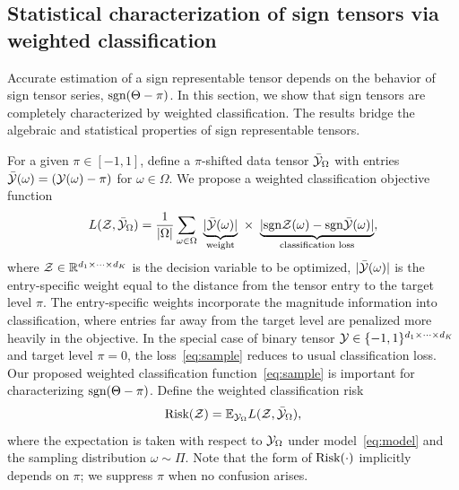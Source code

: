 \documentclass[useAMS,usenatbib,usegraphicx,referee]{biom}
\theoremstyle{plain}
\theoremstyle{definition}
\newcommand*{\KeepStyleUnderBrace}[1]{%
  \mathop{%
    \mathchoice
    {\underbrace{\displaystyle#1}}%
    {\underbrace{\textstyle#1}}%
    {\underbrace{\scriptstyle#1}}%
    {\underbrace{\scriptscriptstyle#1}}%
  }\limits
}
\def\sign{\textup{sgn}}
\begin{document}
\vspace{-.6cm}
\subsection{Statistical characterization of sign tensors via weighted classification}\label{sec:identifiability}

Accurate estimation of a sign representable tensor depends on the behavior of sign tensor series, $\sign(\Theta-\pi)$. In this section, we show that sign tensors are completely characterized by weighted classification. The results bridge the algebraic and statistical properties of sign representable tensors.
 
For a given $\pi \in [-1,1]$, define a $\pi$-shifted data tensor $\bar {\mathcal{Y}}_\Omega$ with entries $\bar {\mathcal{Y}}(\omega) = (\mathcal{Y}(\omega)-\pi)$ for $\omega\in \Omega$. We propose a weighted classification objective function
\begin{equation}\label{eq:sample}
L(\tZ, \bar \tY_\Omega)= {1\over |\Omega|}\sum_{\omega \in \Omega}\ \KeepStyleUnderBrace{|\bar \tY(\omega)|}_{\text{weight}}\  \times \ \KeepStyleUnderBrace{| \sign \tZ(\omega)-\sign \bar \tY(\omega)|}_{\text{classification loss}},
\end{equation}
where $\mathcal{Z}\in\mathbb{R}^{d_1\times \cdots \times d_K}$ is the decision variable to be optimized, $|\bar {\mathcal{Y}}(\omega)|$ is the entry-specific weight equal to the distance from the tensor entry to the target level $\pi$. The entry-specific weights incorporate the magnitude information into classification, where entries far away from the target level are penalized more heavily in the objective. In the special case of binary tensor $\mathcal{Y}\in\{-1,1\}^{d_1\times\cdots\times d_K}$ and target level $\pi=0$, the loss~\eqref{eq:sample} reduces to usual classification loss.
Our proposed weighted classification function~\eqref{eq:sample} is important for characterizing $\sign(\Theta-\pi)$. Define the weighted classification risk 
\begin{equation}\label{eq:population}
\textup{Risk}(\tZ)=\mathbb{E}_{\tY_\Omega}L(\tZ,\bar\tY_\Omega),
\end{equation}
where the expectation is taken with respect to $\mathcal{Y}_\Omega$ under model~\eqref{eq:model} and the sampling distribution $\omega\sim\Pi$. Note that the form of $\textup{Risk}(\cdot)$ implicitly depends on $\pi$; we suppress $\pi$ when no confusion arises. 

\vspace{-.3cm}
\end{document}
